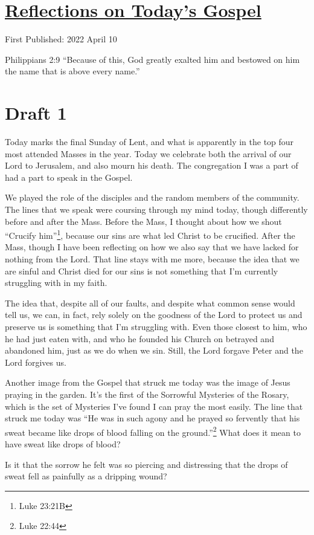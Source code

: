 \documentclass[12pt]{article}[titlepage]
\newcommand{\say}[1]{``#1''}
\newcommand{\1}{\={a}}
\newcommand{\2}{\={e}}
\newcommand{\3}{\={\i}}
\newcommand{\4}{\=o}
\newcommand{\5}{\=u}
\newcommand{\6}{\={A}}
\renewcommand{\,}{\textsuperscript{,}}
\begin{document}
\doublespacing
\section{\href{reflections-on-readings-palm-c-2022.html}{Reflections on Today's Gospel}}
First Published: 2022 April 10

Philippians 2:9 \say{Because of this, God greatly exalted him
and bestowed on him the name
that is above every name.}

\section{Draft 1}
Today marks the final Sunday of Lent, and what is apparently in the top four most attended Masses in the year.
Today we celebrate both the arrival of our Lord to Jerusalem, and also mourn his death.
The congregation I was a part of had a part to speak in the Gospel.

We played the role of the disciples and the random members of the community.
The lines that we speak were coursing through my mind today, though differently before and after the Mass.
Before the Mass, I thought about how we shout \say{Crucify him}\footnote{Luke 23:21B}, because our sins are what led Christ to be crucified.
After the Mass, though I have been reflecting on how we also say that we have lacked for nothing from the Lord.
That line stays with me more, because the idea that we are sinful and Christ died for our sins is not something that I'm currently struggling with in my faith.

The idea that, despite all of our faults, and despite what common sense would tell us, we can, in fact, rely solely on the goodness of the Lord to protect us and preserve us is something that I'm struggling with.
Even those closest to him, who he had just eaten with, and who he founded his Church on betrayed and abandoned him, just as we do when we sin.
Still, the Lord forgave Peter and the Lord forgives us.

Another image from the Gospel that struck me today was the image of Jesus praying in the garden.
It's the first of the Sorrowful Mysteries of the Rosary, which is the set of Mysteries I've found I can pray the most easily.
The line that struck me today was \say{He was in such agony and he prayed so fervently that his sweat became like drops of blood falling on the ground.}\footnote{Luke 22:44}
What does it mean to have sweat like drops of blood?

Is it that the sorrow he felt was so piercing and distressing that the drops of sweat fell as painfully as a dripping wound?
\end{document}
